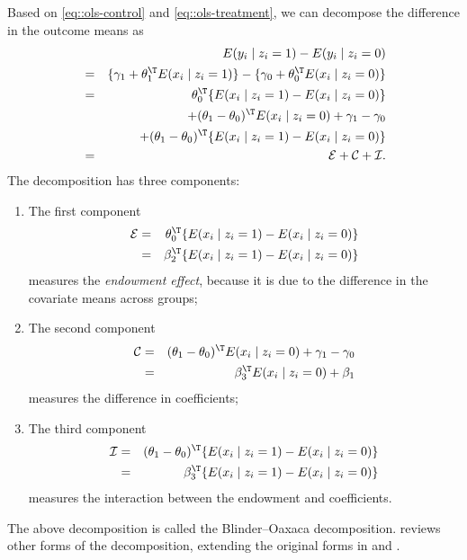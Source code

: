 Based on \eqref{eq::ols-control} and \eqref{eq::ols-treatment}, we can decompose the difference in the outcome means as
\begin{eqnarray*}
&& E(y_i \mid z_i = 1) - E(y_i \mid z_i = 0) \\
&=&  \{ \gamma_1 + \theta_1^{\T} E(x_i \mid z_i = 1)  \} - \{ \gamma_0 + \theta_0^{\T} E(x_i \mid z_i = 0 )  \} \\
&=& \theta_0^{\T}  \{ E(x_i \mid z_i = 1)  -   E(x_i \mid z_i = 0 ) \}  \\
&&  + (\theta_1 - \theta_0) ^{\T}   E(x_i \mid z_i = 0 )    +  \gamma_1 - \gamma_0  \\
&&  + (\theta_1 - \theta_0) ^{\T} \{ E(x_i \mid z_i = 1)  -   E(x_i \mid z_i = 0 ) \} \\
&=& \mathcal E  + \mathcal C  + \mathcal I . 
\end{eqnarray*}
The decomposition has three components:
\begin{enumerate}[label=(\textup{C}\arabic*), ref=\textup{C}\arabic*]
\item
The first component 
\begin{eqnarray*}
\mathcal E 
&=& 
\theta_0^{\T}  \{ E(x_i \mid z_i = 1)  -   E(x_i \mid z_i = 0 ) \}  \\
&=& \beta_2^{\T}  \{ E(x_i \mid z_i = 1)  -   E(x_i \mid z_i = 0 ) \} 
\end{eqnarray*}
measures the {\it endowment effect}, because it is due to the difference in the covariate means across groups;
\item 
The second component
\begin{eqnarray*}
\mathcal C 
&=& 
(\theta_1 - \theta_0) ^{\T}   E(x_i \mid z_i = 0 )    +  \gamma_1 - \gamma_0  \\
&=& \beta_3^{\T}   E(x_i \mid z_i = 0 ) + \beta_1
\end{eqnarray*}
measures the difference in coefficients;
\item 
The third component 
\begin{eqnarray*}
\mathcal I 
&=& 
(\theta_1 - \theta_0) ^{\T} \{ E(x_i \mid z_i = 1)  -   E(x_i \mid z_i = 0 ) \} \\
&=& \beta_3^{\T}  \{ E(x_i \mid z_i = 1)  -   E(x_i \mid z_i = 0 ) \}
\end{eqnarray*}
measures the interaction between the endowment and coefficients.
\end{enumerate}


The above decomposition is called the Blinder--Oaxaca decomposition. \citet{jann2008blinder} reviews other forms of the decomposition, extending the original forms in \citet{blinder1973wage} and \citet{oaxaca1973male}. 

